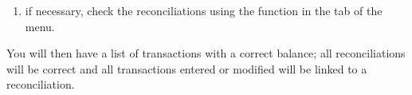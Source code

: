 \begin{enumerate}
	\item if necessary, check the reconciliations using the  function in the  tab of the  menu.
\end{enumerate}

You will then have a list of transactions with a correct balance; all reconciliations will be correct and all transactions entered or modified will be linked to a reconciliation.
